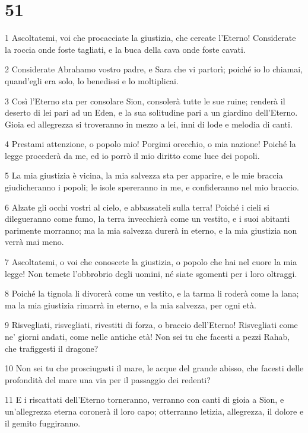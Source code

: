 \chapter{51}

\par 1 Ascoltatemi, voi che procacciate la giustizia, che cercate l'Eterno! Considerate la roccia onde foste tagliati, e la buca della cava onde foste cavati.
\par 2 Considerate Abrahamo vostro padre, e Sara che vi partorì; poiché io lo chiamai, quand'egli era solo, lo benedissi e lo moltiplicai.
\par 3 Così l'Eterno sta per consolare Sion, consolerà tutte le sue ruine; renderà il deserto di lei pari ad un Eden, e la sua solitudine pari a un giardino dell'Eterno. Gioia ed allegrezza si troveranno in mezzo a lei, inni di lode e melodia di canti.
\par 4 Prestami attenzione, o popolo mio! Porgimi orecchio, o mia nazione! Poiché la legge procederà da me, ed io porrò il mio diritto come luce dei popoli.
\par 5 La mia giustizia è vicina, la mia salvezza sta per apparire, e le mie braccia giudicheranno i popoli; le isole spereranno in me, e confideranno nel mio braccio.
\par 6 Alzate gli occhi vostri al cielo, e abbassateli sulla terra! Poiché i cieli si dilegueranno come fumo, la terra invecchierà come un vestito, e i suoi abitanti parimente morranno; ma la mia salvezza durerà in eterno, e la mia giustizia non verrà mai meno.
\par 7 Ascoltatemi, o voi che conoscete la giustizia, o popolo che hai nel cuore la mia legge! Non temete l'obbrobrio degli uomini, né siate sgomenti per i loro oltraggi.
\par 8 Poiché la tignola li divorerà come un vestito, e la tarma li roderà come la lana; ma la mia giustizia rimarrà in eterno, e la mia salvezza, per ogni età.
\par 9 Risvegliati, risvegliati, rivestiti di forza, o braccio dell'Eterno! Risvegliati come ne' giorni andati, come nelle antiche età! Non sei tu che facesti a pezzi Rahab, che trafiggesti il dragone?
\par 10 Non sei tu che prosciugasti il mare, le acque del grande abisso, che facesti delle profondità del mare una via per il passaggio dei redenti?
\par 11 E i riscattati dell'Eterno torneranno, verranno con canti di gioia a Sion, e un'allegrezza eterna coronerà il loro capo; otterranno letizia, allegrezza, il dolore e il gemito fuggiranno.
